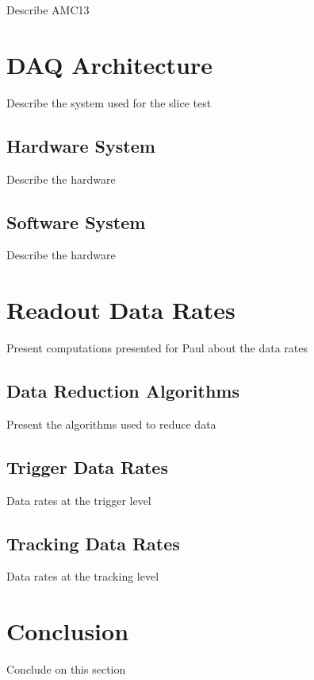                 Describe AMC13

    \section{DAQ Architecture}

        Describe the system used for the slice test

        \subsection{Hardware System}

            Describe the hardware

        \subsection{Software System}

            Describe the hardware

    \section{Readout Data Rates}

        Present computations presented for Paul about the data rates

        \subsection{Data Reduction Algorithms}

            Present the algorithms used to reduce data

        \subsection{Trigger Data Rates}

            Data rates at the trigger level

        \subsection{Tracking Data Rates}

            Data rates at the tracking level

    \section{Conclusion}

        Conclude on this section


